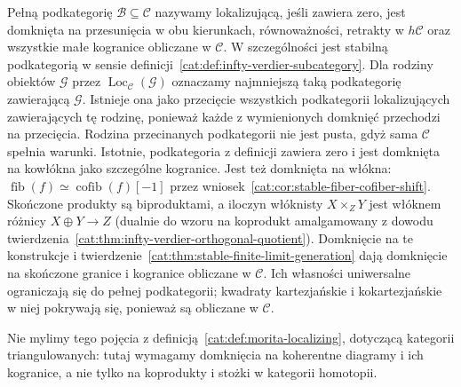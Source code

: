 \begin{definicja}\label{cat:def:infty-stable-localizing}
Pełną podkategorię $\mathcal B\subseteq\mathcal C$ nazywamy lokalizującą, jeśli zawiera zero, jest domknięta na przesunięcia w obu kierunkach, równoważności, retrakty w $h\mathcal C$ oraz wszystkie małe kogranice obliczane w $\mathcal C$. W szczególności jest stabilną podkategorią w sensie definicji~\ref{cat:def:infty-verdier-subcategory}. Dla rodziny obiektów $\mathcal G$ przez $\operatorname{Loc}_{\mathcal C}(\mathcal G)$ oznaczamy najmniejszą taką podkategorię zawierającą $\mathcal G$. Istnieje ona jako przecięcie wszystkich podkategorii lokalizujących zawierających tę rodzinę, ponieważ każde z wymienionych domknięć przechodzi na przecięcia. Rodzina przecinanych podkategorii nie jest pusta, gdyż sama $\mathcal C$ spełnia warunki. Istotnie, podkategoria z definicji zawiera zero i jest domknięta na kowłókna jako szczególne kogranice. Jest też domknięta na włókna: $\operatorname{fib}(f)\simeq\operatorname{cofib}(f)[-1]$ przez wniosek~\ref{cat:cor:stable-fiber-cofiber-shift}. Skończone produkty są biproduktami, a iloczyn włóknisty $X\times_ZY$ jest włóknem różnicy $X\oplus Y\to Z$ (dualnie do wzoru na koprodukt amalgamowany z dowodu twierdzenia~\ref{cat:thm:infty-verdier-orthogonal-quotient}). Domknięcie na te konstrukcje i twierdzenie~\ref{cat:thm:stable-finite-limit-generation} dają domknięcie na skończone granice i kogranice obliczane w $\mathcal C$. Ich własności uniwersalne ograniczają się do pełnej podkategorii; kwadraty kartezjańskie i kokartezjańskie w niej pokrywają się, ponieważ są obliczane w $\mathcal C$.
\end{definicja}

Nie mylimy tego pojęcia z definicją~\ref{cat:def:morita-localizing}, dotyczącą kategorii triangulowanych: tutaj wymagamy domknięcia na koherentne diagramy i ich kogranice, a nie tylko na koprodukty i stożki w kategorii homotopii.

